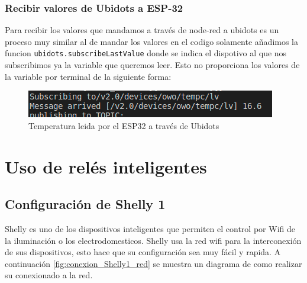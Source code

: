 \documentclass[11pt, letterpaper]{article}
\begin{document}
\subsubsection{Recibir valores de Ubidots a ESP-32}
Para recibir los valores que mandamos a través de node-red a ubidots es un proceso muy similar al de mandar los valores 
en el codigo solamente añadimos la funcion \texttt{ubidots.subscribeLastValue} donde se indica el dispotivo al que nos subscribimos ya la 
variable que queremos leer. Esto no proporciona los valores de la variable por terminal de la siguiente forma:

\begin{figure}[h]
	\centering
	\includegraphics[width=\textwidth]{Temperatura_recibida_ESP32.png}
	\caption{Temperatura leida por el ESP32 a través de Ubidots} 
	\label{fig:temp}
\end{figure}

\section{Uso de relés inteligentes}
\subsection{Configuración de Shelly 1}
Shelly es uno de los dispositivos inteligentes que permiten 
el control por Wifi de la iluminación o los electrodomesticos.
Shelly usa la red wifi para la interconexión de sus dispositivos, esto 
hace que su configuración sea muy fácil y rapida. A continuación \ref*{fig:conexion_Shelly1_red} se muestra un diagrama 
de como realizar su conexionado a la red.
\end{document}
